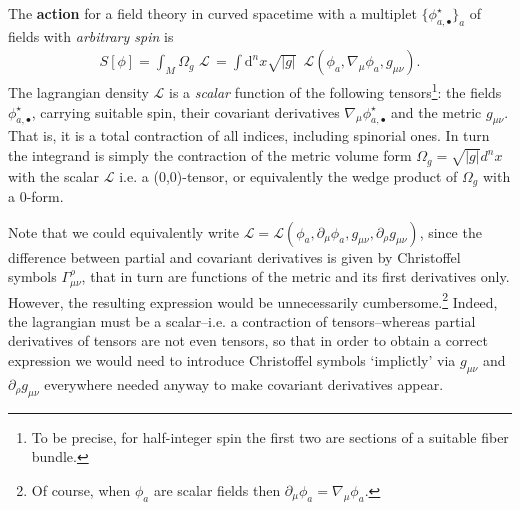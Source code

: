 \begin{mytheorem}
%
The \textbf{action} for a field theory in curved spacetime with a multiplet $\{\phi^\star_{a,\bullet}\}_a$ of fields with \emph{arbitrary spin} is 
\begin{align}\label{eq:general_matter_lagrangian}
    S[\phi] =  \int_M \Omega_g\,\,\mathcal{L}\,=\int \mathrm{d}^n x \sqrt{|g|} \,\,\, \mathcal{L}(\phi_a, \nabla_\mu \phi_a, g_{\mu\nu}).
\end{align}
The lagrangian density $\mathcal{L}$ is a \emph{scalar} function of the following tensors\footnote{To be precise, for half-integer spin the first two are sections of a suitable fiber bundle.}: the fields $\phi^\star_{a,\bullet}$, carrying suitable spin, their covariant derivatives $\nabla_\mu \phi^\star_{a,\bullet}$ and the metric $g_{\mu\nu}$.
That is, it is a total contraction of all indices, including spinorial ones.
In turn the integrand is simply the contraction of the metric volume form $\Omega_g = \sqrt{|g|} d^n x$ with the scalar $\mathcal{L}$ i.e. a (0,0)-tensor, or equivalently the wedge product of $\Omega_g$ with a 0-form.

Note that we could equivalently write $\mathcal{L}=\mathcal{L}(\phi_a, \partial_\mu \phi_a, g_{\mu\nu},\partial_\rho g_{\mu\nu})$, since the difference between partial and covariant derivatives is given by Christoffel symbols $\Gamma_{\mu\nu}^\rho$, that in turn are functions of the metric and its first derivatives only.
However, the resulting expression would be unnecessarily cumbersome.\footnote{Of course, when $\phi_a$ are scalar fields then $\partial_\mu\phi_a=\nabla_\mu\phi_a$.} Indeed, the lagrangian must be a scalar--i.e. a contraction of tensors--whereas partial derivatives of tensors are not even tensors, so that in order to obtain a correct expression we would need to introduce Christoffel symbols `implictly' via $g_{\mu\nu}$ and $\partial_\rho g_{\mu\nu}$ everywhere needed anyway to make covariant derivatives appear.


\end{mytheorem}
